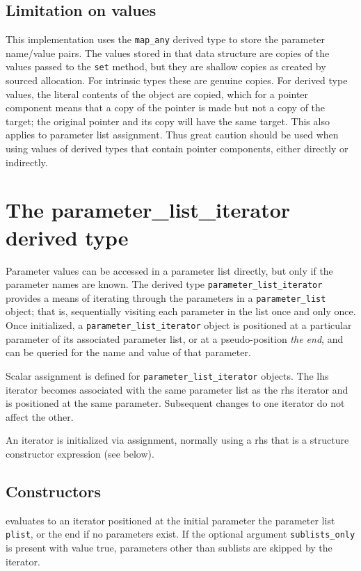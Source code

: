 \documentclass[11pt]{article}
\begin{document}
\subsection{Limitation on values}
This implementation uses the \texttt{map_any} derived type to store the
parameter name/value pairs.  The values stored in that data structure are
copies of the values passed to the \texttt{set} method, but they are shallow
copies as created by sourced allocation.  For intrinsic types these are
genuine copies.  For derived type values, the literal contents of the object
are copied, which for a pointer component means that a copy of the pointer
is made but not a copy of the target; the original pointer and its copy will
have the same target.  This also applies to parameter list assignment.
Thus great caution should be used when using values of derived types that
contain pointer components, either directly or indirectly.

\section{The parameter_list_iterator derived type}
Parameter values can be accessed in a parameter list directly, but only if
the parameter names are known.  The derived type
\texttt{parameter_list_iterator} provides a means of iterating through
the parameters in a \texttt{parameter_list} object; that is, sequentially
visiting each parameter in the list once and only once.  Once initialized,
a \texttt{parameter_list_iterator} object is positioned at a particular
parameter of its associated parameter list, or at a pseudo-position
\emph{the end}, and can be queried for the name and value of that parameter. 

Scalar assignment is defined for \texttt{parameter_list_iterator} objects.
The lhs iterator becomes associated with the same parameter list as the rhs
iterator and is positioned at the same parameter.  Subsequent changes to one
iterator do not affect the other.

An iterator is initialized via assignment, normally using a rhs that is
a structure constructor expression (see below).

\subsection{Constructors}
\begin{description}[style=nextline]\setlength{\itemsep}{0pt}
\item[\texttt{parameter_list_iterator(plist \Lbr,sublists_only\Rbr)}]
  evaluates to an iterator positioned at the initial parameter the parameter
  list \texttt{plist}, or the end if no parameters exist.  If the optional
  argument \texttt{sublists_only} is present with value true, parameters other
  than sublists are skipped by the iterator.
\end{description}
\end{document}
